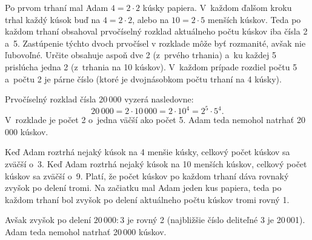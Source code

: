 {%
Po prvom trhaní mal Adam $4=2\cdot2$ kúsky papiera.
V~každom ďalšom kroku trhal každý kúsok buď na $4=2\cdot2$, alebo na $10=2\cdot5$ menších kúskov.
Teda po každom trhaní obsahoval prvočíselný rozklad aktuálneho počtu kúskov iba čísla 2 a~5.
Zastúpenie týchto dvoch prvočísel v rozklade môže byť rozmanité, avšak nie ľubovoľné.
Určite obsahuje aspoň dve 2 (z~prvého trhania) a~ku každej 5 prislúcha jedna 2 (z~trhania na 10 kúskov).
V~každom prípade rozdiel počtu 5 a~počtu 2 je párne číslo (ktoré je dvojnásobkom počtu trhaní na 4 kúsky).

Prvočíselný rozklad čísla 20\,000 vyzerá nasledovne:
$$
20\,000 =2\cdot10\,000 =2\cdot10^4 =2^5\cdot5^4 .
$$
V~rozklade je počet 2 o~jedna väčší ako počet 5.
Adam teda nemohol natrhať 20\,000 kúskov.

\ineriesenie
Keď Adam roztrhá nejaký kúsok na 4 menšie kúsky, celkový počet kúskov sa zväčší o~3.
Keď Adam roztrhá nejaký kúsok na 10 menších kúskov, celkový počet kúskov sa zväčší o~9.
Platí, že počet kúskov po každom trhaní dáva rovnaký zvyšok po delení tromi.
Na začiatku mal Adam jeden kus papiera, teda po každom trhaní bol zvyšok po delení aktuálneho počtu kúskov tromi rovný 1.

Avšak zvyšok po delení $20\,000:3$ je rovný 2 (najbližšie číslo deliteľné 3 je 20\,001).
Adam teda nemohol natrhať 20\,000 kúskov.
}

